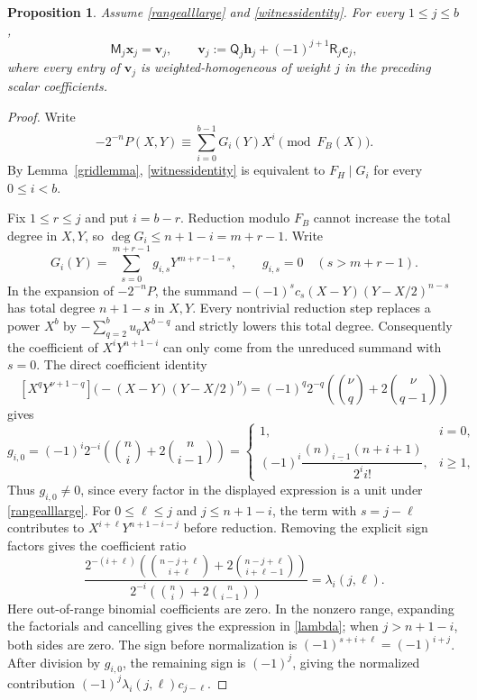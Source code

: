 \documentclass[12pt]{article}
\newtheorem{proposition}{Proposition}[section]
\theoremstyle{remark}
\newcommand{\fall}[2]{(#1)_{\underline{#2}}}
\begin{document}
\begin{proposition}\label{largegaprecursion}
Assume \eqref{rangealllarge} and \eqref{witnessidentity}.  For every
$1\le j\le b$,
\begin{equation}\label{coefficient_system}
 \mathsf M_j\mathbf x_j=\mathbf v_j,
 \qquad
 \mathbf v_j:=\mathsf Q_j\mathbf h_j
              +(-1)^{j+1}\mathsf R_j\mathbf c_j,
\end{equation}
where every entry of $\mathbf v_j$ is weighted-homogeneous of weight
$j$ in the preceding scalar coefficients.
\end{proposition}
\begin{proof}
Write
\[
 -2^{-n}P(X,Y)\equiv\sum_{i=0}^{b-1}G_i(Y)X^i
                  \pmod{F_B(X)}.
\]
By Lemma~\ref{gridlemma}, \eqref{witnessidentity} is equivalent to
$F_H\mid G_i$ for every $0\le i<b$.

Fix $1\le r\le j$ and put $i=b-r$.  Reduction modulo $F_B$ cannot
increase the total degree in $X,Y$, so $\deg G_i\le n+1-i=m+r-1$.
Write
\[
 G_i(Y)=\sum_{s=0}^{m+r-1}g_{i,s}Y^{m+r-1-s},
 \qquad g_{i,s}=0\quad(s>m+r-1).
\]
In the expansion of $-2^{-n}P$, the summand
$-(-1)^sc_s(X-Y)(Y-X/2)^{n-s}$ has total degree $n+1-s$ in $X,Y$.
Every nontrivial reduction step replaces a power $X^b$ by
$-\sum_{q=2}^{b}u_qX^{b-q}$ and strictly lowers this total degree.
Consequently the coefficient of $X^iY^{n+1-i}$ can only come from
the unreduced summand with $s=0$.  The direct coefficient identity
\[
 [X^qY^{\nu+1-q}]\bigl(-(X-Y)(Y-X/2)^\nu\bigr)
 =(-1)^q2^{-q}
 \left(\binom{\nu}{q}+2\binom{\nu}{q-1}\right)
\]
gives
\begin{equation}\label{leading_gi}
 g_{i,0}=(-1)^i2^{-i}
 \left(\binom ni+2\binom n{i-1}\right)
 =\begin{cases}
 1,&i=0,\\[1mm]
 (-1)^i\dfrac{\fall n{i-1}(n+i+1)}{2^ii!},&i\ge1,
 \end{cases}
\end{equation}
Thus $g_{i,0}\ne0$, since every factor in the displayed expression
is a unit under \eqref{rangealllarge}.  For $0\le\ell\le j$ and
$j\le n+1-i$, the term with
$s=j-\ell$ contributes to $X^{i+\ell}Y^{n+1-i-j}$ before reduction.
Removing the explicit sign factors gives the coefficient ratio
\begin{equation*}
 \frac{2^{-(i+\ell)}
  \left(\binom{n-j+\ell}{i+\ell}
              +2\binom{n-j+\ell}{i+\ell-1}\right)}
 {2^{-i}\left(\binom ni+2\binom n{i-1}\right)}
 =\lambda_i(j,\ell).
\end{equation*}
Here out-of-range binomial coefficients are zero.  In the nonzero
range, expanding the factorials and cancelling gives the expression
in \eqref{lambda}; when $j>n+1-i$, both sides are zero.
The sign before normalization is $(-1)^{s+i+\ell}=(-1)^{i+j}$.
After division by $g_{i,0}$, the remaining sign is $(-1)^j$, giving the
normalized contribution $(-1)^j\lambda_i(j,\ell)c_{j-\ell}$.


\end{proof}
\end{document}
